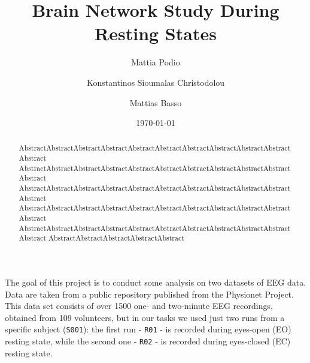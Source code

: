 \documentclass[%
 aip,
 jmp,%
 amsmath,amssymb,
 reprint,%
]{revtex4-1}
\begin{document}
\title[Brain Network Study During Resting States]{Brain Network Study During Resting States\\}

\author{Mattia Podio}

\author{Konstantinos Sioumalas Christodolou}%

\author{Mattias Basso}

\date{\today}%

\begin{abstract}
AbstractAbstractAbstractAbstractAbstractAbstractAbstractAbstractAbstractAbstractAbstract AbstractAbstractAbstractAbstractAbstractAbstractAbstractAbstractAbstractAbstractAbstract AbstractAbstractAbstractAbstractAbstractAbstractAbstractAbstractAbstractAbstractAbstract AbstractAbstractAbstractAbstractAbstractAbstractAbstractAbstractAbstractAbstractAbstract AbstractAbstractAbstractAbstractAbstractAbstractAbstractAbstractAbstractAbstractAbstract AbstractAbstractAbstractAbstractAbstract
\end{abstract}

\maketitle



The goal of this project is to conduct some analysis on two datasets of EEG data. Data \cite{dataset} are taken from a public repository published from the Physionet Project. This data set consists of over 1500 one- and two-minute EEG recordings, obtained from 109 volunteers, but in our tasks we used just two runs from a specific subject (\verb|S001|): the first run - \verb|R01| - is recorded during eyes-open (EO) resting state, while the second one - \verb|R02| - is recorded during eyes-closed (EC) resting state.
\end{document}
